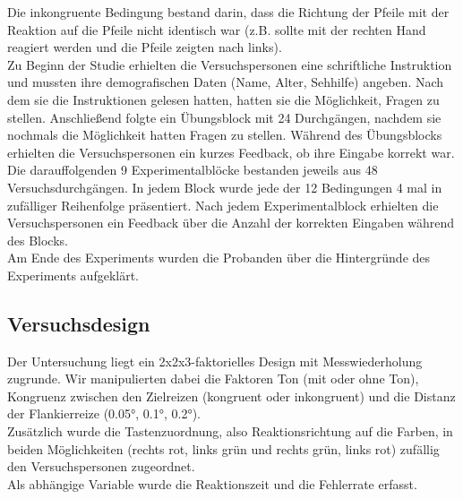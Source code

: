 Die inkongruente Bedingung bestand darin, dass die Richtung der Pfeile mit der Reaktion auf die Pfeile nicht identisch war (z.B. sollte mit der rechten Hand reagiert werden und die Pfeile zeigten nach links).\\
Zu Beginn der Studie erhielten die Versuchspersonen eine schriftliche Instruktion und mussten ihre demografischen Daten (Name, Alter, Sehhilfe) angeben. Nach dem sie die Instruktionen gelesen hatten, hatten sie die Möglichkeit, Fragen zu stellen. Anschließend folgte ein Übungsblock mit 24 Durchgängen, nachdem sie nochmals die Möglichkeit hatten Fragen zu stellen. Während des Übungsblocks erhielten die Versuchspersonen ein kurzes Feedback, ob ihre Eingabe korrekt war.\\
Die darauffolgenden 9 Experimentalblöcke bestanden jeweils aus 48 Versuchsdurchgängen. In jedem Block wurde jede der 12 Bedingungen 4 mal in zufälliger Reihenfolge präsentiert. Nach jedem Experimentalblock erhielten die Versuchspersonen ein Feedback über die Anzahl der korrekten Eingaben während des Blocks.\\
Am Ende des Experiments wurden die Probanden über die Hintergründe des Experiments aufgeklärt.

\subsection{Versuchsdesign}
Der Untersuchung liegt ein 2x2x3-faktorielles Design mit Messwiederholung zugrunde. Wir manipulierten dabei die Faktoren Ton (mit oder ohne Ton), Kongruenz zwischen den Zielreizen (kongruent oder inkongruent) und die Distanz der Flankierreize (0.05°, 0.1°, 0.2°).\\
Zusätzlich wurde die Tastenzuordnung, also Reaktionsrichtung auf die Farben, in beiden Möglichkeiten (rechts rot, links grün und rechts grün, links rot) zufällig den Versuchspersonen zugeordnet.\\
Als abhängige Variable wurde die Reaktionszeit und die Fehlerrate erfasst.
